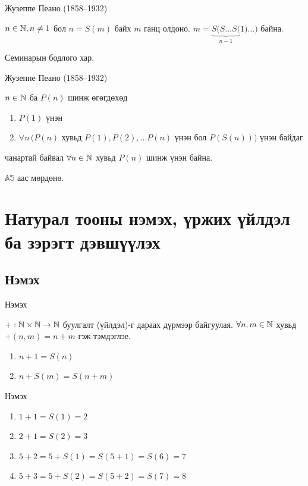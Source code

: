 \begin{frame}[allowframebreaks]{Жузеппе Пеано (1858–1932)}
\begin{theorem}
   $n\in\mathbb{N} , n\neq 1$ бол $n=S(m)$ байх $m$ ганц олдоно. $m=\underbrace{S(S\ldots S(}_{n-1}1)\ldots)$ байна.
\end{theorem}
\begin{prof}
     Семинарын бодлого хар.
\end{prof}
\end{frame}

\begin{frame}[allowframebreaks]{Жузеппе Пеано (1858–1932)}
\begin{theorem}\label{mathind}
$n\in\mathbb{N}$ ба $P(n)$ шинж өгөгдөхөд 
\begin{enumerate}
    \item $P(1)$ үнэн
    \item $\forall n\,(P(n)$ хувьд $P(1), P(2), \ldots P(n)$ үнэн бол $P(S(n)))$ үнэн байдаг
\end{enumerate} чанартай байвал $\forall n\in\mathbb{N}$ хувьд $P(n)$ шинж үнэн байна.
\end{theorem}
\begin{prof}
    $\mathbb{A5}$ аас мөрдөнө.
\end{prof}
\end{frame}

\section{Натурал тооны нэмэх, үржих үйлдэл ба зэрэгт дэвшүүлэх}
\subsection{Нэмэх}
\begin{frame}[allowframebreaks]{Нэмэх}
\begin{definition} $+: \mathbb{N}\times \mathbb{N}\to\mathbb{N}$ буулгалт (үйлдэл)-г дараах дүрмээр байгуулая. $\forall n , m\in\mathbb{N}$ хувьд $+(n,m)=n+m$ гэж тэмдэглэе.
\begin{enumerate}[label=\textbf{N\arabic*})]
    \item $ n+1= S(n)$
    \item $n+S(m)=S(n+m)$
\end{enumerate} 
\end{definition}
\end{frame}

\begin{frame}[allowframebreaks]{Нэмэх}
\begin{example}
    \begin{enumerate}
        \item $1+1=S(1)=2$
        \item $2+1=S(2)=3$
        \item $5+2=5+S(1)=S(5+1)=S(6)=7$
        \item $5+3=5+S(2)=S(5+2)=S(7)=8$
    \end{enumerate}
\end{example}
\end{frame}

